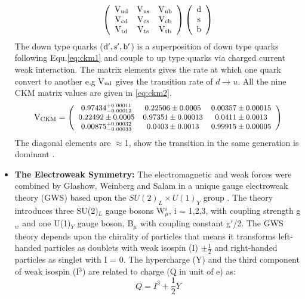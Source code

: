 \begin{itemize}
\begin{equation}
	  \left( \begin{array}{ccc}
      \rm  V_{ud} &\rm V_{us} &\rm V_{ub}\\
      \rm  V_{cd} &\rm V_{cs} &\rm V_{cb}\\
      \rm  V_{td} &\rm V_{ts} &\rm V_{tb}\end{array} \right)
\left({\begin{array}{ccc} \rm d \\ \rm s \\ \rm b \end{array}}\right)
\end{equation}  
The down type quarks ($\rm d', \rm s', \rm b'$) is a superposition of down type quarks following Equ.\ref{eq:ckm1} and couple to up type quarks via charged current weak interaction. The matrix elements gives the rate at which one quark convert to another e.g $\rm V_{ud}$ gives the transition rate of $d \rightarrow u$. All the nine CKM matrix values are given in \ref{eq:ckm2}.
\begin{equation}\label{eq:ckm2}    \small 
\rm V_{\rm CKM}	=  \left( \begin{array}{ccc}
      \rm  0.97434_{-0.00012}^{+0.00011} &\rm 0.22506\pm 0.0005&\rm 0.00357\pm 0.00015\\
      \rm  0.22492\pm 0.0005 &\rm 0.97351\pm 0.00013 &\rm 0.0411\pm 0.0013\\
      \rm  0.00875_{-0.00033}^{+0.00032} &\rm 0.0403\pm 0.0013 &\rm 0.99915\pm 0.00005\end{array} \right)
\end{equation}
The diagonal elements are $\approx$1, show the transition in the same generation is dominant \cite{ckm}.\item{\textbf{The Electroweak Symmetry:}}
The electromagnetic and weak forces were combined by Glashow, Weinberg and Salam in a unique gauge electroweak theory (GWS) based upon the $SU(2)_{L}\times U(1)_{Y}$ group \cite{gws}. The theory introduces three SU(2)$_{L}$ gauge bosons W$^{i}_{\mu}$, i = 1,2,3, with coupling strength g$_{w}$ and one U(1)$_{Y}$ gauge boson, B$_{\mu}$ with coupling constant g$'$/2. The GWS theory depends upon the chirality of particles that means it transforms left-handed particles as doublets with weak isospin (I) $\pm\frac{1}{2}$ and right-handed particles as singlet with I = 0. The hypercharge (Y) and the third component of weak isospin (I$^{3}$) are related to charge (Q in unit of e) as:
\begin{equation}\label{eq:}
Q = I^{3} + \frac{1}{2}Y
\end{equation}  

\end{itemize}
